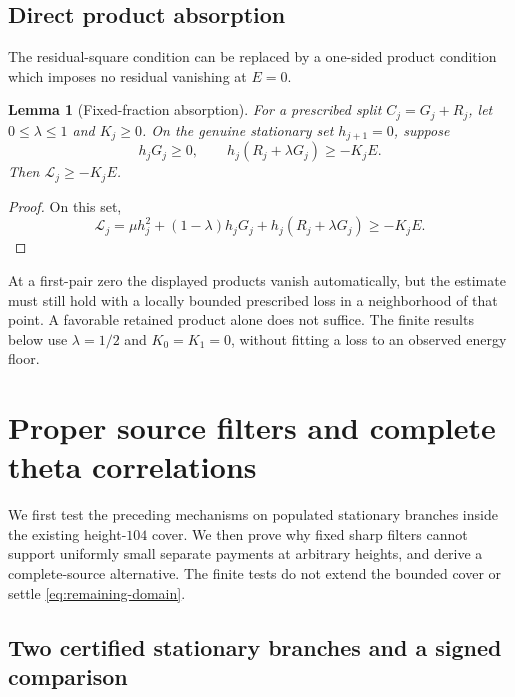 \documentclass[11pt]{article}
\numberwithin{equation}{section}
\newtheorem{lemma}[theorem]{Lemma}
\theoremstyle{definition}
\theoremstyle{remark}
\newcommand{\Lag}{\mathcal L}
\begin{document}
\subsection{Direct product absorption}

The residual-square condition can be replaced by a one-sided product
condition which imposes no residual vanishing at $E=0$.
\begin{lemma}[Fixed-fraction absorption]\label{lem:direct-absorption}
For a prescribed split $C_j=G_j+R_j$, let $0\le\lambda\le1$ and
$K_j\ge0$. On the genuine stationary set $h_{j+1}=0$, suppose
\begin{equation}
 h_jG_j\ge0,\qquad h_j(R_j+\lambda G_j)\ge-K_jE.
 \label{eq:direct-absorption}
\end{equation}
Then $\Lag_j\ge-K_jE$.
\end{lemma}
\begin{proof}
On this set,
\[
 \Lag_j=\mu h_j^2+(1-\lambda)h_jG_j
                      +h_j(R_j+\lambda G_j)\ge-K_jE.
\]
\end{proof}
At a first-pair zero the displayed products vanish automatically, but
the estimate must still hold with a locally bounded prescribed loss in
a neighborhood of that point. A favorable retained product alone does
not suffice. The finite results below use $\lambda=1/2$ and
$K_0=K_1=0$, without fitting a loss to an observed energy floor.


\section{Proper source filters and complete theta correlations}
\label{sec:source-filters}

We first test the preceding mechanisms on populated stationary branches
inside the existing height-$104$ cover. We then prove why fixed sharp
filters cannot support uniformly small separate payments at arbitrary
heights, and derive a complete-source alternative. The finite tests do
not extend the bounded cover or settle \eqref{eq:remaining-domain}.

\subsection{Two certified stationary branches and a signed comparison}
\end{document}
